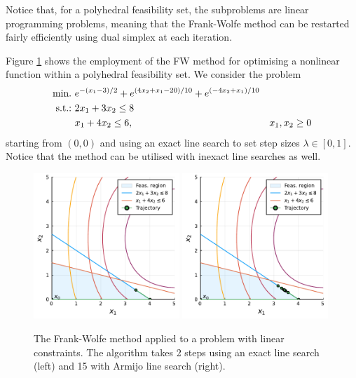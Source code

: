 Notice that, for a polyhedral feasibility set, the subproblems are linear programming problems, meaning that the Frank-Wolfe method can be restarted fairly efficiently using dual simplex at each iteration. 

Figure \ref{fig:frank_wolfe} shows the employment of the FW method for optimising a nonlinear function within a polyhedral feasibility set. We consider the problem
\begin{align*}
	\mathop{\text{min.~}} & e^{-(x_1-3)/2} + e^{(4x_2 + x_1 - 20)/10} + e^{(-4x_2 + x_1)/10}\\
	\mathop{\text{s.t.:~}} & 2x_1 + 3x_2 \leq 8 \\
	& x_1 + 4x_2 \leq 6,
	& x_1, x_2 \ge 0	
\end{align*}
starting from $(0,0)$ and using an exact line search to set step sizes $\lambda \in [0,1]$. Notice that the method can be utilised with inexact line searches as well. 

\begin{figure}
	\includegraphics[width=0.49\textwidth]{part_2/chapter_11/figures/FW_alliter}
	\includegraphics[width=0.49\textwidth]{part_2/chapter_11/figures/FW_alliter_armijo}	
	\caption{The Frank-Wolfe method applied to a problem with linear constraints. The algorithm takes 2 steps using an exact line search (left) and 15 with Armijo line search (right).} \label{fig:frank_wolfe}
\end{figure}

